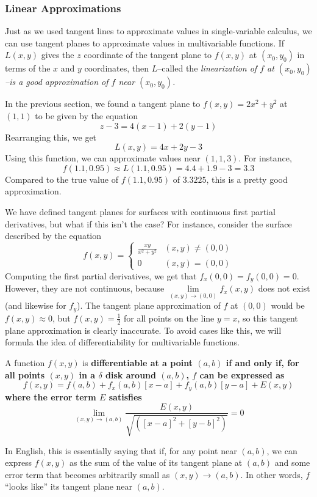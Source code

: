 \subsubsection{Linear Approximations}  
Just as we used tangent lines to approximate values in single-variable calculus, we can use tangent planes to approximate values in multivariable functions. If \(L(x,y)\) gives the \(z\) coordinate of the tangent plane to \(f(x,y)\) at \((x_0, y_0)\) in terms of the \(x\) and \(y\) coordinates, then \(L\)--called the \it{linearization} of \(f\) at \((x_0, y_0)\)--is a good approximation of \(f\) near \((x_0, y_0)\). \par
In the previous section, we found a tangent plane to \(f(x,y)=2x^2+y^2\) at \((1,1)\) to be given by the equation
\[ z - 3 = 4(x-1) + 2(y-1) \]
Rearranging this, we get
\[ L(x, y) = 4x+2y-3 \]
Using this function, we can approximate values near \((1,1,3)\). For instance,
\[ f(1.1, 0.95) \approx L(1.1, 0.95) = 4.4 + 1.9 - 3 = 3.3 \]
Compared to the true value of \(f(1.1, 0.95)\) of \(3.3225\), this is a pretty good approximation.\par
We have defined tangent planes for surfaces with continuous first partial derivatives, but what if this isn't the case? For instance, consider the surface described by the equation
\[ f(x,y) = \begin{cases}
    \frac{xy}{x^2+y^2}&(x,y)\neq(0,0) \\
    0&(x,y)=(0,0)
\end{cases}\]
Computing the first partial derivatives, we get that \(f_x(0,0)=f_y(0,0)=0\). However, they are not continuous, because \(\lim\limits_{(x,y)\to (0,0)}f_x(x,y)\) does not exist (and likewise for \(f_y\)). The tangent plane approximation of \(f\) at \((0,0)\) would be \(f(x,y)\approx 0\), but \(f(x,y)=\frac{1}{2}\) for all points on the line \(y=x\), so this tangent plane approximation is clearly inaccurate. To avoid cases like this, we will formula the idea of differentiability for multivariable functions. \par 
\begin{definition}
    A function \(f(x,y)\) is \bf{differentiable} at a point \((a, b)\) if and only if, for all points \((x,y)\) in a \(\delta\) disk around \((a,b)\), \(f\) can be expressed as
    \[ f(x, y) = f(a, b) + f_x(a,b)[x-a] + f_y(a,b)[y-a] + E(x,y)\]
    where the error term \(E\) satisfies 
    \[ \lim_{(x,y)\to(a,b)}\frac{E(x,y)}{\sqrt{([x-a]^2+[y-b]^2)}}=0\]
\end{definition}
In English, this is essentially saying that if, for any point near \((a,b)\), we can express \(f(x,y)\) as the sum of the value of its tangent plane at \((a,b)\) and some error term that becomes arbitrarily small as \((x,y)\to(a,b)\). In other words, \(f\) ``looks like'' its tangent plane near \((a,b)\).\par
